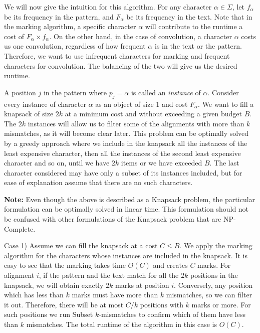 We will now give the intuition for this algorithm. For any
character $\alpha \in \Sigma$, let $f_\alpha$ be its frequency in the pattern,
and $F_\alpha$ be its frequency in the text. Note that in the marking algorithm,
a specific character $\alpha$ will contribute to the runtime a cost of
$F_{\alpha} \times f_{\alpha}$. On the other hand, in the case of convolution, a
character $\alpha$ costs us one convolution, regardless of how frequent $\alpha$
is in the text or the pattern. Therefore, we want to use infrequent
characters for marking and frequent characters for convolution. The balancing of
the two will give us the desired runtime.

A position $j$ in
the pattern where $p_j = \alpha$ is called an {\em instance} of $\alpha$. 
Consider every instance of character $\alpha$ as an object of size
$1$ and cost $F_\alpha$. We want to fill a knapsack of size $2k$ at a minimum
cost and without exceeding a given budget $B$. The $2k$
instances will allow us to filter some of the alignments with more
than $k$ mismatches, as it will become clear later. This
problem can be optimally solved by a greedy approach where we include in the knapsack all the instances of the least expensive character, then all the instances of the second least expensive character and so on, until we have $2k$ items or we have exceeded $B$. The last
character considered may have only a subset of its instances included, but for
ease of explanation assume that there are no such characters.

{\bf Note:} Even though the above is described as a Knapsack problem, the
particular formulation can be optimally solved in linear time. This formulation should not be
confused with other formulations of the Knapsack problem that are NP-Complete.

Case 1) Assume we can fill the knapsack at a cost $C \leq B$. We apply the
marking algorithm for the characters whose instances are included in the
knapsack. It is easy to see that the marking takes time $O(C)$ and creates $C$
marks. For alignment $i$, if the pattern and the text match for all the $2k$
positions in the knapsack, we will obtain exactly $2k$ marks at position $i$. 
Conversely, any position which has less than $k$ marks must have more
than $k$ mismatches, so we can filter it out. Therefore, there will be at
most $C/k$ positions with $k$ marks or more. For such positions we run Subset
$k$-mismatches to confirm which of them have less than $k$ mismatches.
The total runtime of the algorithm in this case is $O(C)$.

